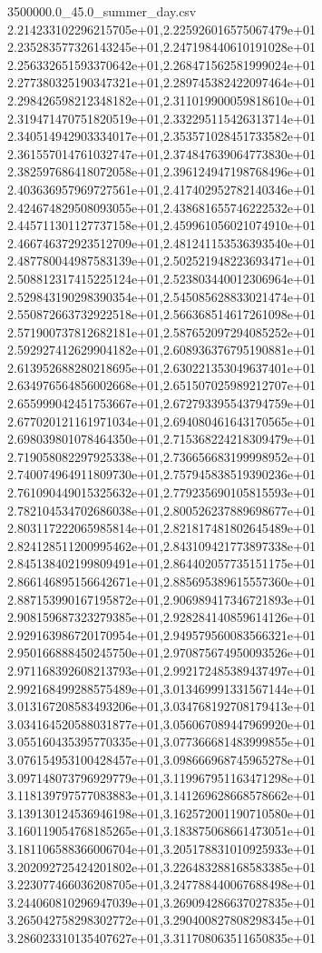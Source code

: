 \begin{filecontents*}{3500000.0_45.0_summer_day.csv}
2.214233102296215705e+01,2.225926016575067479e+01
2.235283577326143245e+01,2.247198440610191028e+01
2.256332651593370642e+01,2.268471562581999024e+01
2.277380325190347321e+01,2.289745382422097464e+01
2.298426598212348182e+01,2.311019900059818610e+01
2.319471470751820519e+01,2.332295115426313714e+01
2.340514942903334017e+01,2.353571028451733582e+01
2.361557014761032747e+01,2.374847639064773830e+01
2.382597686418072058e+01,2.396124947198768496e+01
2.403636957969727561e+01,2.417402952782140346e+01
2.424674829508093055e+01,2.438681655746222532e+01
2.445711301127737158e+01,2.459961056021074910e+01
2.466746372923512709e+01,2.481241153536393540e+01
2.487780044987583139e+01,2.502521948223693471e+01
2.508812317415225124e+01,2.523803440012306964e+01
2.529843190298390354e+01,2.545085628833021474e+01
2.550872663732922518e+01,2.566368514617261098e+01
2.571900737812682181e+01,2.587652097294085252e+01
2.592927412629904182e+01,2.608936376795190881e+01
2.613952688280218695e+01,2.630221353049637401e+01
2.634976564856002668e+01,2.651507025989212707e+01
2.655999042451753667e+01,2.672793395543794759e+01
2.677020121161971034e+01,2.694080461643170565e+01
2.698039801078464350e+01,2.715368224218309479e+01
2.719058082297925338e+01,2.736656683199998952e+01
2.740074964911809730e+01,2.757945838519390236e+01
2.761090449015325632e+01,2.779235690105815593e+01
2.782104534702686038e+01,2.800526237889698677e+01
2.803117222065985814e+01,2.821817481802645489e+01
2.824128511200995462e+01,2.843109421773897338e+01
2.845138402199809491e+01,2.864402057735151175e+01
2.866146895156642671e+01,2.885695389615557360e+01
2.887153990167195872e+01,2.906989417346721893e+01
2.908159687323279385e+01,2.928284140859614126e+01
2.929163986720170954e+01,2.949579560083566321e+01
2.950166888450245750e+01,2.970875674950093526e+01
2.971168392608213793e+01,2.992172485389437497e+01
2.992168499288575489e+01,3.013469991331567144e+01
3.013167208583493206e+01,3.034768192708179413e+01
3.034164520588031877e+01,3.056067089447969920e+01
3.055160435395770335e+01,3.077366681483999855e+01
3.076154953100428457e+01,3.098666968745965278e+01
3.097148073796929779e+01,3.119967951163471298e+01
3.118139797577083883e+01,3.141269628668578662e+01
3.139130124536946198e+01,3.162572001190710580e+01
3.160119054768185265e+01,3.183875068661473051e+01
3.181106588366006704e+01,3.205178831010925933e+01
3.202092725424201802e+01,3.226483288168583385e+01
3.223077466036208705e+01,3.247788440067688498e+01
3.244060810296947039e+01,3.269094286637027835e+01
3.265042758298302772e+01,3.290400827808298345e+01
3.286023310135407627e+01,3.311708063511650835e+01

\end{filecontents*}
